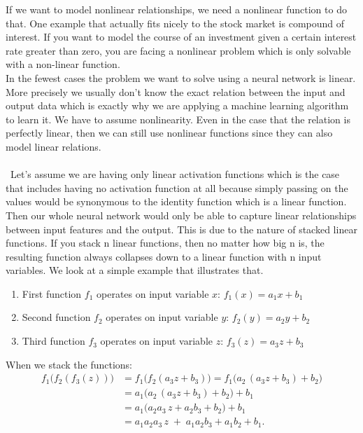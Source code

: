 \documentclass[a4paper,12pt]{report}
\begin{document}
If we want to model nonlinear relationships, we need a nonlinear function to do that. One example that actually fits nicely to the stock market is compound of interest. If you want to model the course of an investment given a certain interest rate greater than zero, you are facing a nonlinear problem which is only solvable with a non-linear function. \\
In the fewest cases the problem we want to solve using a neural network is linear. More precisely we usually don’t know the exact relation between the input and output data which is exactly why we are applying a machine learning algorithm to learn it. We have to assume nonlinearity. Even in the case that the relation is perfectly linear, then we can still use nonlinear functions since they can also model linear relations.\\
\\\
Let’s assume we are having only linear activation functions which is the case that includes having no activation function at all because simply passing on the values would be synonymous to the identity function which is a linear function. Then our whole neural network would only be able to capture linear relationships between input features and the output. This is due to the nature of stacked linear functions. If you stack n linear functions, then no matter how big n is, the resulting function always collapses down to a linear function with n input variables. We look at a simple example that illustrates that.
\begin{enumerate}
  \item First function $f_{1}$ operates on input variable $x$:\hfill
    $\displaystyle f_{1}(x)=a_{1}x+b_{1}$

  \item Second function $f_{2}$ operates on input variable $y$:\hfill
    $\displaystyle f_{2}(y)=a_{2}y+b_{2}$

  \item Third function $f_{3}$ operates on input variable $z$:\hfill
    $\displaystyle f_{3}(z)=a_{3}z+b_{3}$
\end{enumerate}

When we stack the functions:
\begin{align*}
  f_1\bigl(f_2(f_3(z))\bigr)
  &= f_1\bigl(f_2(a_3 z + b_3)\bigr)
   = f_1\bigl(a_2\,(a_3 z + b_3) + b_2\bigr)\\
  &= a_1\bigl(a_2\,(a_3 z + b_3) + b_2\bigr) + b_1\\
  &= a_1\bigl(a_2 a_3\,z + a_2 b_3 + b_2\bigr) + b_1\\
  &= a_1 a_2 a_3\,z \;+\; a_1 a_2 b_3 + a_1 b_2 + b_1.
\end{align*}
\end{document}
